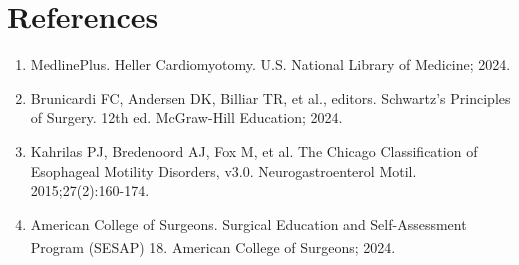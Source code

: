 \section*{References}
\begin{enumerate}
  \item MedlinePlus. Heller Cardiomyotomy. U.S. National Library of Medicine; 2024.
  \item Brunicardi FC, Andersen DK, Billiar TR, et al., editors. Schwartz's Principles of Surgery. 12th ed. McGraw-Hill Education; 2024.
  \item Kahrilas PJ, Bredenoord AJ, Fox M, et al. The Chicago Classification of Esophageal Motility Disorders, v3.0. Neurogastroenterol Motil. 2015;27(2):160-174.
  \item American College of Surgeons. Surgical Education and Self-Assessment Program (SESAP\textsuperscript{\textregistered}) 18. American College of Surgeons; 2024.
\end{enumerate}

\clearpage
